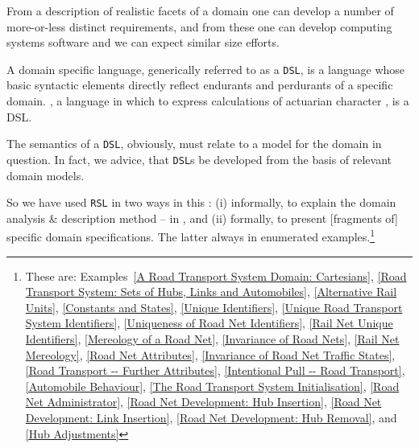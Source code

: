 \begynd
\pind From a description of realistic facets of a domain \nyl one can
      develop a number of more-or-less distinct requirements,
\pind and from these one can develop computing systems software \nyl
      and we can expect similar size efforts.
\afslut


\begynd
\pind A domain specific language, generically referred to as a \texttt{DSL},
\begynd
\pind is a language whose basic syntactic elements directly reflect
      endurants and perdurants of a specific domain.
\pind {}, a language in which to express calculations of
      actuarian character \cite{actulus2015}, is a DSL. 
\afslut
      
\pind The semantics of a \texttt{DSL}, obviously, must relate to a
      model for the domain in question. 
\pind In fact, we advice, that \texttt{DSL}s be developed from the
      basis of relevant domain models.
\afslut
  

\label{RSL-II}

\begynd
{}
\pind So we have used \texttt{RSL} in two ways in this \primer:
\begynd
\pind (i)  informally, to explain the domain analysis \& description
           method -- in \rslplus, and
\pind (ii) formally, to present [fragments of] specific domain
           specifications. 
\afslut
\pind The latter always in enumerated examples.\footnote{\LLLL These
  are: Examples\,%
  \LLll\noindent%
\vref{A Road Transport System Domain: Cartesians},\nyl
      \vref{Road Transport System: Sets of Hubs, Links and Automobiles},  \nyl 
      \vref{Alternative Rail Units}, \nyl
      \vref{Constants and States},  \nyl
      \vref{Unique Identifiers},    \nyl     
      \vref{Unique Road Transport System Identifiers},  \nyl     
      \vref{Uniqueness of Road Net Identifiers}, \nyl  
      \vref{Rail Net Unique Identifiers},  \nyl      
      \vref{Mereology of a Road Net},  \nyl
      \vref{Invariance of Road Nets},  \nyl     
      \vref{Rail Net Mereology},    \nyl
      \vref{Road Net Attributes},     \nyl  
      \vref{Invariance of Road Net Traffic States}, \nyl    
      \vref{Road Transport -- Further Attributes}, \nyl  
      \vref{Intentional Pull -- Road Transport},  \nyl   
      \vref{Automobile Behaviour},     \nyl
      \vref{The Road Transport System Initialisation}, \nyl    
      \vref{Road Net Administrator},     \nyl  
      \vref{Road Net Development: Hub Insertion}, \nyl      
      \vref{Road Net Development: Link Insertion}, \nyl
      \vref{Road Net Development: Hub Removal}, and  \nyl    
      \vref{Hub Adjustments}
\pos{}{\end{multicols}}}
\afslut 

